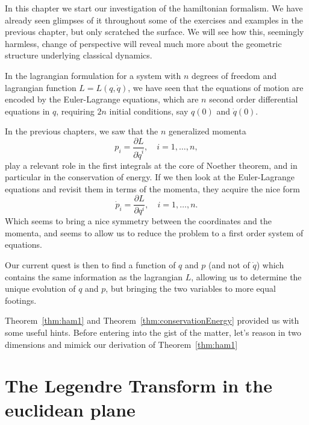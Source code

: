 \documentclass[english,fontsize=11pt,paper=a5,oneside]{scrbook}
\theoremstyle{definition}
\begin{document}
In this chapter we start our investigation of the hamiltonian formalism.
We have already seen glimpses of it throughout some of the exercises and examples in the previous chapter, but only scratched the surface.
We will see how this, seemingly harmless, change of perspective will reveal much more about the geometric structure underlying classical dynamics.

In the lagrangian formulation for a system with $n$ degrees of freedom and lagrangian function $L=L(q, \dot q)$, we have seen that the equations of motion are encoded by the Euler-Lagrange equations, which are $n$ second order differential equations in $q$, requiring $2n$ initial conditions, say $q(0)$ and $\dot q(0)$.

In the previous chapters, we saw that the $n$ generalized momenta
\begin{equation}
    p_i = \frac{\partial L}{\partial \dot q^i}, \quad i=1,\ldots,n,
\end{equation}
play a relevant role in the first integrals at the core of Noether theorem, and in particular in the conservation of energy.
If we then look at the Euler-Lagrange equations and revisit them in terms of the momenta, they acquire the nice form
\begin{equation}
    \dot p_i = \frac{\partial L}{\partial q^i}, \quad i=1,\ldots,n.
\end{equation}
Which seems to bring a nice symmetry between the coordinates and the momenta, and seems to allow us to reduce the problem to a first order system of equations.

Our current quest is then to find a function of $q$ and $p$ (and not of $\dot q$) which contains the same information as the lagrangian $L$, allowing us to determine the unique evolution of $q$ and $p$, but bringing the two variables to more equal footings.

Theorem~\ref{thm:ham1} and Theorem~\ref{thm:conservationEnergy} provided us with some useful hints.
Before entering into the gist of the matter, let's reason in two dimensions and mimick our derivation of Theorem~\ref{thm:ham1}

\section{The Legendre Transform in the euclidean plane}
\end{document}
